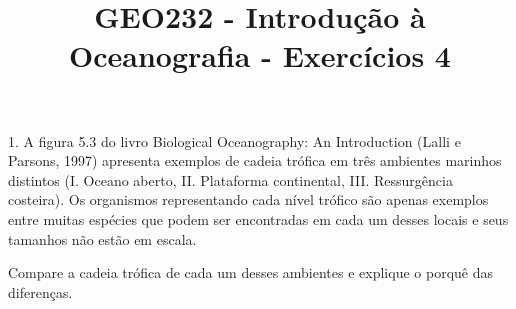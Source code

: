 \documentclass[a4paper,10pt]{article}
\title{GEO232 - Introdução à Oceanografia - Exercícios 4}
\author{\vspace{-10ex}}
\date{\vspace{-10ex}}
\begin{document}
 \maketitle
 

1. A figura 5.3 do livro Biological Oceanography: An Introduction (Lalli e Parsons, 1997) apresenta exemplos de cadeia trófica em três ambientes marinhos distintos (I. Oceano aberto, II. Plataforma continental, III. Ressurgência costeira). Os organismos representando cada nível trófico são apenas exemplos entre muitas espécies que podem ser encontradas em cada um desses locais e seus tamanhos não estão em escala. 


Compare a cadeia trófica de cada um desses ambientes e explique o porquê das diferenças.
\end{document}
